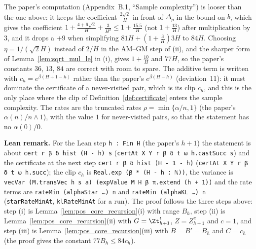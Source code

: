 \begin{remark}\label{rem:pos_constants_recursion}
The paper's computation (Appendix~B.1, ``Sample complexity'') is looser than the one above: it
keeps the coefficient $\frac{2\sqrt2}{H}$ in front of $\Delta_p$ in the bound on $b$, which gives the
coefficient $1 + \frac{4 + 6\sqrt2}{H} + \frac{3}{H^2} \le 1 + \frac{15.5}{H}$ (not $1 + \frac{13}{H}$) after
multiplication by $3$, and it drops a $+9$ when simplifying $81H + (1 + \frac3H)3H$ to $84H$.
Choosing $\eta = 1/(\sqrt2 H)$ instead of $2/H$ in the AM--GM step of (ii), and the sharper
form of Lemma~\ref{lem:sqrt_mul_le} in (i), gives $1 + \frac{10}{H}$ and $77H$, so the paper's
constants $36$, $13$, $84$ are correct with room to spare. The additive term is written with
$c_h = e^{\beta(H+1-h)}$ rather than the paper's $e^{\beta(H-h)}$ (deviation~11): it must dominate
the certificate of a never-visited pair, which is its clip $c_h$, and this is the only place
where the clip of Definition~\ref{def:certificate} enters the sample complexity. The rates are
the truncated rates $\rho = \min\{\alpha/n, 1\}$ (the paper's $\alpha(n)/n \wedge 1$), with the value
$1$ for never-visited pairs, so that the statement has no $\alpha(0)/0$.
\end{remark}

\textbf{Lean remark.} For the Lean step \texttt{h : Fin H} (the paper's $h + 1$) the statement is
about \texttt{cert r β δ hist (H - h) s} (\texttt{certAt X Y r β δ t ω h.castSucc s}) and the certificate
at the next step \texttt{cert r β δ hist (H - 1 - h)} (\texttt{certAt X Y r β δ t ω h.succ}); the clip
$c_h$ is \texttt{Real.exp (β * (H - h : ℕ))}, the variance is
\texttt{vecVar (M.transVec h s a) (expValue M H β π.extend (h + 1))} and the rate terms are
\texttt{rateMin (alphaStar …) n} and \texttt{rateMin (alphaKL …) n} (\texttt{starRateMinAt},
\texttt{klRateMinAt} for a run). The proof follows the three steps above: step (i) is
Lemma~\ref{lem:pos_core_recursion}(i) with range $B_h$, step (ii) is Lemma~\ref{lem:pos_core_recursion}(ii)
with $G = \Zt^t_{h+1}$, $Z = Z^\pi_{h+1}$ and $c = 1$, and step (iii) is Lemma~\ref{lem:pos_core_recursion}(iii)
with $B = B' = B_h$ and $C = c_h$ (the proof gives the constant $77 B_h \le 84 c_h$).

